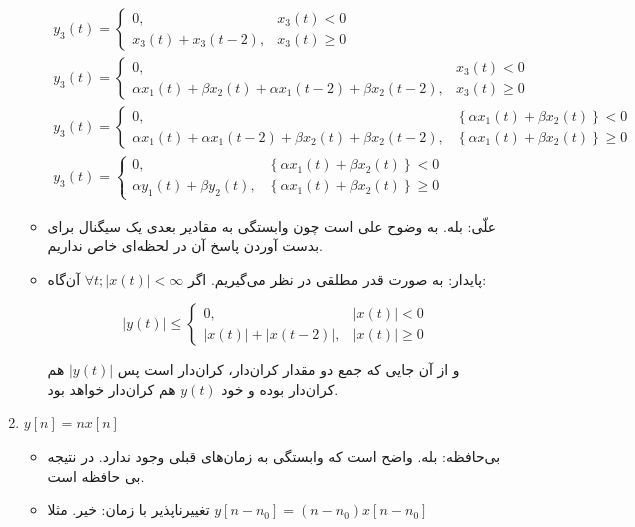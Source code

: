 \documentclass[12pt]{article}
\begin{document}
\begin{enumerate}[label = \harfi*)]
\begin{itemize}
	$$
	\begin{array}{l}
		y_{3}(t)=\left\{\begin{array}{ll}
			0, & x_{3}(t)<0 \\
			x_{3}(t)+x_{3}(t-2), & x_{3}(t) \geq 0
		\end{array}\right. \\
		y_{3}(t)=\left\{\begin{array}{ll}
			0, & x_{3}(t)<0 \\
			\alpha x_{1}(t)+\beta x_{2}(t)+\alpha x_{1}(t-2)+\beta x_{2}(t-2), & x_{3}(t) \geq 0
		\end{array}\right. \\
		y_{3}(t)=\left\{\begin{array}{ll}
			0, & \left\{\alpha x_{1}(t)+\beta x_{2}(t)\right\}<0 \\
			\alpha x_{1}(t)+\alpha x_{1}(t-2)+\beta x_{2}(t)+\beta x_{2}(t-2), & \left\{\alpha x_{1}(t)+\beta x_{2}(t)\right\} \geq 0
		\end{array}\right. \\
		y_{3}(t)=\left\{\begin{array}{ll}
			0, & \left\{\alpha x_{1}(t)+\beta x_{2}(t)\right\}<0 \\
			\alpha y_{1}(t)+\beta y_{2}(t), & \left\{\alpha x_{1}(t)+\beta x_{2}(t)\right\} \geq 0
		\end{array}\right.
	\end{array}
	$$
	\item
	علّی: بله. به وضوح علی است چون وابستگی به مقادیر بعدی یک سیگنال برای بدست آوردن پاسخ آن در لحظه‌ای خاص نداریم.
	\item
	پایدار: به صورت قدر مطلقی در نظر می‌گیریم. اگر
	$\forall t; |x(t)| < \infty$
	آن‌گاه:
	
	$$
	|y(t)| \leq\left\{\begin{array}{ll}
		0, & |x(t)|<0 \\
		|x(t)|+|x(t-2)|, & |x(t)| \geq 0
	\end{array}\right.
	$$
	
	و از آن جایی که جمع دو مقدار کران‌دار، کران‌دار است پس $|y(t)|$ هم کران‌دار بوده و خود $y(t)$ هم کران‌دار خواهد بود.
	
	
\end{itemize}




\item
$y[n] = n x[n]$
\begin{itemize}
	\item
	بی‌حافظه: بله. واضح است که وابستگی به زمان‌های قبلی وجود ندارد. در نتیجه بی حافظه است.
	\item
	تغییرناپذیر با زمان: 
	خیر. مثلا 
	$y[n-n_0] = (n - n_0) x[n - n_0]$
	

\end{itemize}
\end{enumerate}
\end{document}
